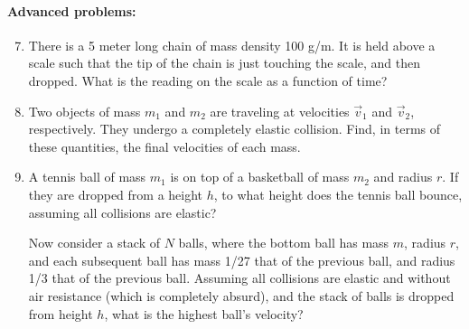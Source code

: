\documentclass[12pt,letterpaper]{article}
\begin{document}
\paragraph{Advanced problems:}
\begin{enumerate}
\setcounter{enumi}{6}
\item
There is a 5 meter long chain of mass density 100 g/m. It is held above a scale such that the tip of the chain is just touching the scale, and then dropped. What is the reading on the scale as a function of time?

\item
Two objects of mass $m_1$ and $m_2$ are traveling at velocities $\vec{v}_1$ and $\vec{v}_2$, respectively. They undergo a completely elastic collision. Find, in terms of these quantities, the final velocities of each mass.

\item
A tennis ball of mass $m_1$ is on top of a basketball of mass $m_2$ and radius $r$. If they are dropped from a height $h$, to what height does the tennis ball bounce, assuming all collisions are elastic?

Now consider a stack of $N$ balls, where the bottom ball has mass $m$, radius $r$, and each subsequent ball has mass 1/27 that of the previous ball, and radius 1/3 that of the previous ball. Assuming all collisions are elastic and without air resistance (which is completely absurd), and the stack of balls is dropped from height $h$, what is the highest ball's velocity?

\end{enumerate}
\end{document}
